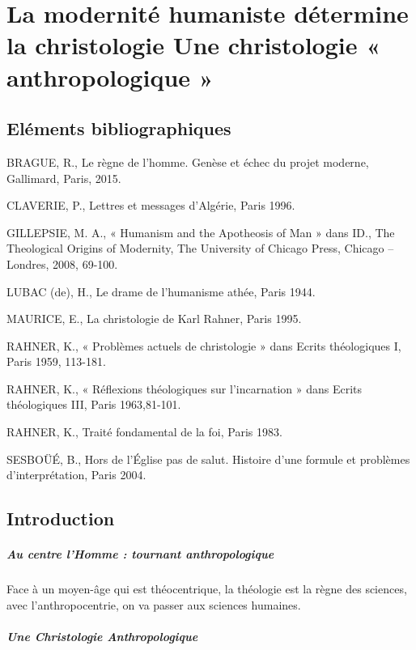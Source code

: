 \chapter{La modernité humaniste détermine la christologie  Une christologie « anthropologique »}

\section{Eléments bibliographiques} 

BRAGUE, R., Le règne de l’homme. Genèse et échec du projet moderne, Gallimard, Paris, 2015. 

CLAVERIE, P.,  Lettres et messages d’Algérie, Paris 1996. 

GILLEPSIE, M. A., « Humanism and the Apotheosis of Man » dans ID., The Theological Origins of Modernity, The University of Chicago Press, Chicago – Londres, 2008, 69-100. 

LUBAC (de), H., Le drame de l’humanisme athée, Paris 1944. 

MAURICE, E., La christologie de Karl Rahner, Paris 1995. 

RAHNER, K., « Problèmes actuels de christologie » dans Ecrits théologiques I, Paris 1959, 113-181. 

RAHNER, K., « Réflexions théologiques sur l’incarnation » dans Ecrits théologiques III, Paris 1963,81-101. 

RAHNER, K., Traité fondamental de la foi, Paris 1983. 

SESBOÜÉ, B., Hors de l’Église pas de salut. Histoire d’une formule et problèmes d’interprétation, Paris 2004. 




\section{Introduction }





\paragraph{Au centre l'Homme : tournant anthropologique} Face à un moyen-âge qui est théocentrique, la théologie est la règne des sciences, avec l'anthropocentrie, on va passer aux sciences humaines. 

\paragraph{Une Christologie Anthropologique}

